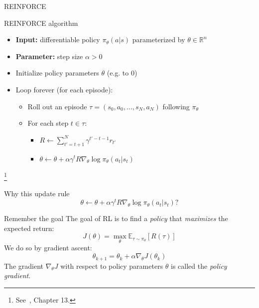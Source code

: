 \documentclass[11pt, aspectratio=169]{beamer}
\newcommand\blfootnote[1]{%
  \begingroup
  \renewcommand\thefootnote{}%
  \footnote{#1}%
  \addtocounter{footnote}{-1}%
  \endgroup
}
\begin{document}
\begin{frame}{REINFORCE}
    \begin{block}{REINFORCE algorithm}
        \begin{itemize}
            \item \textbf{Input:} differentiable policy $\pi_\theta(a | s)$ parameterized by $\theta \in \mathbb{R}^n$
            \item \textbf{Parameter:} step size $\alpha > 0$
            \item Initialize policy parameters $\theta$ (e.g. to $0$)
            \item Loop forever (for each episode):
                \begin{itemize}
                    \item Roll out an episode $\tau = (s_0, a_0, \ldots, s_{N}, a_{N})$ following $\pi_\theta$
                    \item For each step $t \in \tau$:
                        \begin{itemize}
                            \item $R \leftarrow \sum_{t' = t + 1}^N \gamma^{t' - t - 1} r_{t'}$
                            \item $\theta \leftarrow \theta + \alpha \gamma^t R \nabla_\theta \log \pi_\theta(a_t | s_t)$
                        \end{itemize}
                \end{itemize}
        \end{itemize}
    \end{block}
    \blfootnote{
        See~\cite{sutton2018}, Chapter 13.
    }
\end{frame}

\begin{frame}{Why this update rule}
    \LARGE
    $$
    \theta \leftarrow \theta + \alpha \gamma^t R \nabla_\theta \log \pi_\theta(a_t | s_t) ?
    $$
\end{frame}

\begin{frame}{Remember the goal}
    The goal of RL is to find a \emph{policy} that \emph{maximizes} the expected return:
    $$
    J(\theta) = \max_\theta \mathbb{E}_{\tau \sim \pi_\theta}[R(\tau)]
    $$
    We do so by gradient ascent:
    $$
    \theta_{k+1} = \theta_k + \alpha \nabla_\theta J(\theta_k)
    $$
    The gradient $\nabla_\theta J$ with respect to policy parameters $\theta$ is called the \emph{policy gradient}.
\end{frame}
\end{document}
